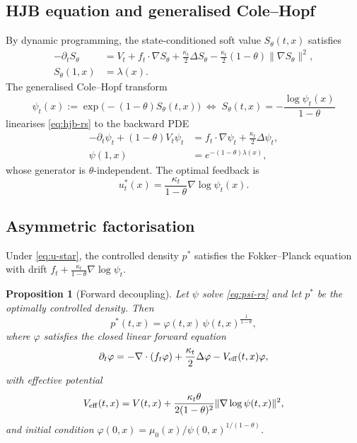 \documentclass[letterpaper,10pt,conference]{IEEEtran}
\newtheorem{proposition}{Proposition}
\begin{document}
	\subsection{HJB equation and generalised Cole--Hopf}
	By dynamic programming, the state-conditioned soft value $S_\theta(t,x)$
	satisfies
	\begin{equation}
		\label{eq:hjb-rs}
		\begin{split}
			-\partial_t S_\theta &= V_t+f_t\cdot\nabla S_\theta+\frac{\kappa_t}{2}\Delta S_\theta
			-\frac{\kappa_t}{2}(1-\theta)\|\nabla S_\theta\|^2,\\
			S_\theta(1,x)&=\lambda(x).
		\end{split}
	\end{equation}
	The generalised Cole--Hopf transform
	\begin{equation}
		\label{eq:ch-rs}
		\psi_t(x):=\exp\!\bigl(-(1-\theta)S_\theta(t,x)\bigr)
		\;\Longleftrightarrow\;
		S_\theta(t,x)=-\frac{\log\psi_t(x)}{1-\theta}
	\end{equation}
	linearises \eqref{eq:hjb-rs} to the backward PDE
	\begin{equation}
		\label{eq:psi-rs}
		\begin{split}
			-\partial_t\psi_t+(1-\theta)V_t\psi_t
			&= f_t\cdot\nabla\psi_t+\frac{\kappa_t}{2}\Delta\psi_t,\\
			\psi(1,x)&=e^{-(1-\theta)\lambda(x)},
		\end{split}
	\end{equation}
	whose generator is $\theta$-independent. The optimal feedback is
	\begin{equation}
		\label{eq:u-star}
		u_t^*(x)=\frac{\kappa_t}{1-\theta}\nabla\log\psi_t(x).
	\end{equation}
	
	\subsection{Asymmetric factorisation}
	Under \eqref{eq:u-star}, the controlled density $p^*$ satisfies the
	Fokker--Planck equation with drift
	$f_t+\frac{\kappa_t}{1-\theta}\nabla\log\psi_t$.
	
	\begin{proposition}[Forward decoupling]
		\label{prop:decouple}
		Let $\psi$ solve \eqref{eq:psi-rs} and let $p^*$ be the optimally controlled
		density. Then
		\begin{equation}
			\label{eq:factor-rs}
			p^*(t,x)=\varphi(t,x)\,\psi(t,x)^{\frac{1}{1-\theta}},
		\end{equation}
		where $\varphi$ satisfies the closed linear forward equation
		\begin{equation}
			\label{eq:G-fwd}
			\partial_t \varphi = -\nabla\cdot(f_t \varphi)+\frac{\kappa_t}{2}\Delta \varphi-V_{\rm eff}(t,x)\varphi,
		\end{equation}
		with effective potential
		\begin{equation}
			\label{eq:Veff}
			V_{\rm eff}(t,x)=V(t,x)+\frac{\kappa_t\theta}{2(1-\theta)^2}\|\nabla\log\psi(t,x)\|^2,
		\end{equation}
		and initial condition $\varphi(0,x)=\mu_0(x)/\psi(0,x)^{1/(1-\theta)}$.
	\end{proposition}
	
\end{document}
